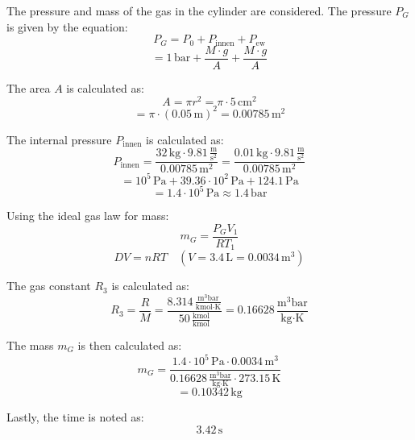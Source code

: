 The pressure and mass of the gas in the cylinder are considered. The pressure \( P_G \) is given by the equation:
\[ P_G = P_0 + P_{\text{innen}} + P_{\text{ew}} \]
\[ = 1 \, \text{bar} + \frac{M \cdot g}{A} + \frac{M \cdot g}{A} \]

The area \( A \) is calculated as:
\[ A = \pi r^2 = \pi \cdot 5 \, \text{cm}^2 \]
\[ = \pi \cdot (0.05 \, \text{m})^2 = 0.00785 \, \text{m}^2 \]

The internal pressure \( P_{\text{innen}} \) is calculated as:
\[ P_{\text{innen}} = \frac{32 \, \text{kg} \cdot 9.81 \, \frac{\text{m}}{\text{s}^2}}{0.00785 \, \text{m}^2} = \frac{0.01 \, \text{kg} \cdot 9.81 \, \frac{\text{m}}{\text{s}^2}}{0.00785 \, \text{m}^2} \]
\[ = 10^5 \, \text{Pa} + 39.36 \cdot 10^2 \, \text{Pa} + 124.1 \, \text{Pa} \]
\[ = 1.4 \cdot 10^5 \, \text{Pa} \approx 1.4 \, \text{bar} \]

Using the ideal gas law for mass:
\[ m_G = \frac{P_G V_1}{R T_1} \]
\[ D V = n R T \quad (V = 3.4 \, \text{L} = 0.0034 \, \text{m}^3) \]

The gas constant \( R_3 \) is calculated as:
\[ R_3 = \frac{R}{M} = \frac{8.314 \, \frac{\text{m}^3 \text{bar}}{\text{kmol} \cdot \text{K}}}{50 \, \frac{\text{kmol}}{\text{kmol}}} = 0.16628 \, \frac{\text{m}^3 \text{bar}}{\text{kg} \cdot \text{K}} \]

The mass \( m_G \) is then calculated as:
\[ m_G = \frac{1.4 \cdot 10^5 \, \text{Pa} \cdot 0.0034 \, \text{m}^3}{0.16628 \, \frac{\text{m}^3 \text{bar}}{\text{kg} \cdot \text{K}} \cdot 273.15 \, \text{K}} \]
\[ = 0.10342 \, \text{kg} \]

Lastly, the time is noted as:
\[ 3.42 \, \text{s} \]